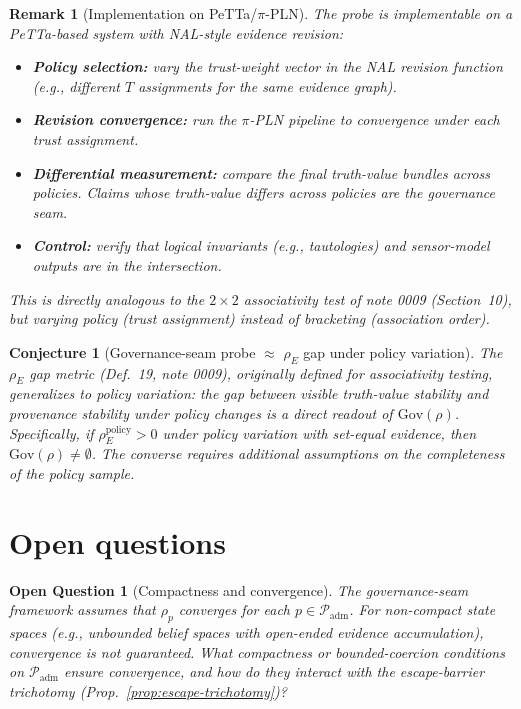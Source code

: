 \documentclass[11pt]{article}
\newtheorem{conjecture}{Conjecture}
\newtheorem{remark}{Remark}
\newtheorem{openquestion}{Open Question}
\newcommand{\Gov}{\mathrm{Gov}}
\newcommand{\Padm}{\mathcal{P}_{\mathrm{adm}}}
\begin{document}
\begin{remark}[Implementation on PeTTa/$\pi$-PLN]
The probe is implementable on a PeTTa-based system with NAL-style evidence revision:
\begin{itemize}
  \item \textbf{Policy selection:} vary the trust-weight vector in the NAL revision function
        (e.g., different $T$ assignments for the same evidence graph).
  \item \textbf{Revision convergence:} run the $\pi$-PLN pipeline to convergence under each
        trust assignment.
  \item \textbf{Differential measurement:} compare the final truth-value bundles across
        policies. Claims whose truth-value differs across policies are the governance seam.
  \item \textbf{Control:} verify that logical invariants (e.g., tautologies) and sensor-model
        outputs are in the intersection.
\end{itemize}
This is directly analogous to the $2 \times 2$ associativity test of note 0009
(Section~10), but varying \emph{policy} (trust assignment) instead of \emph{bracketing}
(association order).
\end{remark}

\begin{conjecture}[Governance-seam probe $\approx$ $\rho_E$ gap under policy variation]
\label{conj:probe-rho-e}
The $\rho_E$ gap metric (Def.~19, note 0009), originally defined for associativity testing,
generalizes to policy variation: the gap between visible truth-value stability and provenance
stability under policy changes is a direct readout of $\Gov(\rho)$. Specifically, if
$\rho_E^{\mathrm{policy}} > 0$ under policy variation with set-equal evidence, then
$\Gov(\rho) \neq \emptyset$. The converse requires additional assumptions on the
completeness of the policy sample.
\end{conjecture}

\section{Open questions}

\begin{openquestion}[Compactness and convergence]
\label{oq:compactness}
The governance-seam framework assumes that $\rho_p$ converges for each $p \in \Padm$. For
non-compact state spaces (e.g., unbounded belief spaces with open-ended evidence accumulation),
convergence is not guaranteed. What compactness or bounded-coercion conditions on $\Padm$
ensure convergence, and how do they interact with the escape-barrier trichotomy
(Prop.~\ref{prop:escape-trichotomy})?
\end{openquestion}
\end{document}

